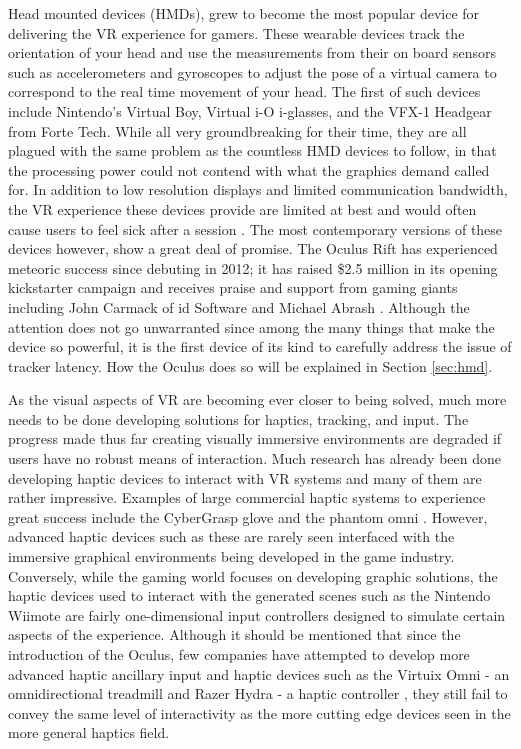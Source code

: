 Head mounted devices (HMDs), grew to become the most popular device for
delivering the VR experience for gamers.  These wearable devices track the
orientation of your head and use the measurements from their on board sensors
such as accelerometers and gyroscopes to adjust the pose of a virtual camera to
correspond to the real time movement of your head.  The first of such devices
include Nintendo's Virtual Boy, Virtual i-O i-glasses, and the VFX-1 Headgear
from Forte Tech. While all very groundbreaking for their time, they are all
plagued with the same problem as the countless HMD devices to follow, in that
the processing power could not contend with what the graphics demand called
for. In addition to low resolution displays and limited communication
bandwidth, the VR experience these devices provide are limited at best and
would often cause users to feel sick after a session
\cite{zachara2009challenges}. The most contemporary versions of these devices
however, show a great deal of promise. The Oculus Rift \cite{website:oculusvr}
has experienced meteoric success since debuting in 2012; it has raised \$2.5
million in its opening kickstarter campaign and receives praise and support
from gaming giants including John Carmack of id Software and Michael Abrash
\cite{website:kickstarterovr}.  Although the attention does not go unwarranted
since among the many things that make the device so powerful, it is the first
device of its kind to carefully address the issue of tracker latency. How the
Oculus does so will be explained in Section \ref{sec:hmd}.

As the visual aspects of VR are becoming ever closer to being solved, much more
needs to be done developing solutions for haptics, tracking, and input.  The
progress made thus far creating visually immersive environments are degraded if
users have no robust means of interaction. Much research has already been done
developing haptic devices to interact with VR systems and many of them are
rather impressive. Examples of large commercial haptic systems to experience
great success include the CyberGrasp glove \cite{website:cybergrasp} and the
phantom omni \cite{website:geomagic}. However, advanced haptic devices such as
these are rarely seen interfaced with the immersive graphical environments
being developed in the game industry. Conversely, while the gaming world
focuses on developing graphic solutions, the haptic devices used to interact
with the generated scenes such as the Nintendo Wiimote \cite{website:wiimote}
are fairly one-dimensional input controllers designed to simulate certain
aspects of the experience. Although it should be mentioned that since the
introduction of the Oculus, few companies have attempted to develop more
advanced haptic ancillary input and haptic devices such as the Virtuix Omni -
an omnidirectional treadmill and Razer Hydra - a haptic controller
\cite{website:razer}, they still fail to convey the same level of interactivity
as the more cutting edge devices seen in the more general haptics field. 

